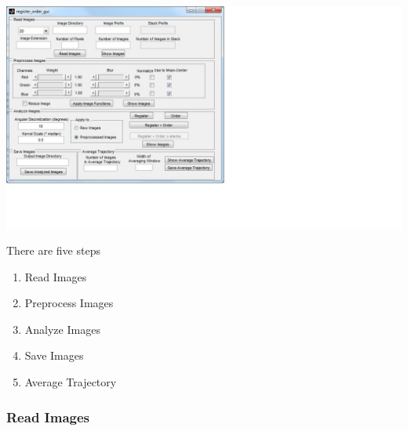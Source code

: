 \documentclass[12pt]{article}
\begin{document}
\includegraphics[width=\textwidth, trim=0cm 3cm 12cm 0cm, clip]{gui_screenshot_initial.jpg}

There are five steps
%
\begin{enumerate}
\item Read Images
\item Preprocess Images
\item Analyze Images
\item Save Images
\item Average Trajectory
\end{enumerate}

\subsubsection{Read Images}
\end{document}
